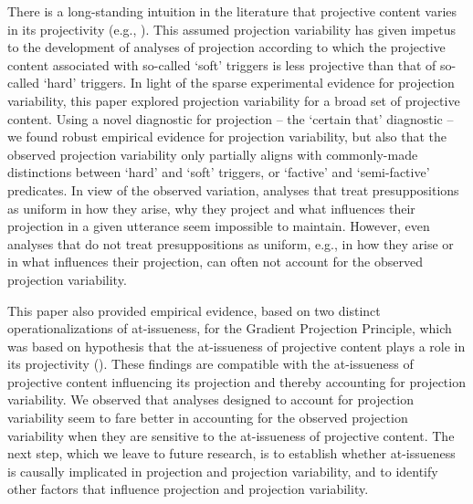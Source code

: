 \documentclass[11pt,fleqn]{article}
\newcommand{\6}{\mbox{$[\hspace*{-.6mm}[$}}
\newcommand{\9}{\mbox{$]\hspace*{-.6mm}]$}}
\begin{document}
There is a long-standing intuition in the literature that projective content varies in its projectivity (e.g., \citealt{karttunen71b,simons01,abusch10}). This assumed projection variability has given impetus to the development of analyses of projection according to which the projective content associated with so-called `soft' triggers is less projective than that of so-called `hard' triggers. In light of the sparse experimental evidence for projection variability, this paper explored projection variability for a broad set of projective content. Using a novel diagnostic for projection -- the `certain that' diagnostic -- we found robust empirical evidence for projection variability, but also that the observed projection variability only partially aligns with commonly-made distinctions between `hard' and `soft' triggers, or `factive' and `semi-factive' predicates. In view of the observed variation, analyses that treat presuppositions as uniform in how they arise, why they project and what influences their projection in a given utterance seem impossible to maintain. However, even analyses that do not treat presuppositions as uniform, e.g., in how they arise or in what influences their projection, can often not account for the observed projection variability. 

This paper also provided empirical evidence, based on two distinct operationalizations of at-issueness, for the Gradient Projection Principle, which was based on hypothesis that the at-issueness of projective content plays a role in its projectivity (\citealt{brst-salt10,brst-ar}). These findings are compatible with the at-issueness of projective content influencing its projection and thereby accounting for projection variability. We observed that analyses designed to account for projection variability seem to fare better in accounting for the observed projection variability when they are sensitive to the at-issueness of projective content. The next step, which we leave to future research, is to establish whether at-issueness is causally implicated in projection and projection variability, and to identify other factors that influence projection and projection variability.

\appendix

\setcounter{table}{0}
\renewcommand{\thetable}{A\arabic{table}}
\end{document}

